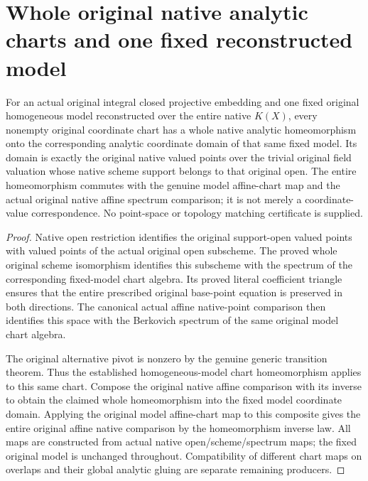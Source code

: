 \section{Whole original native analytic charts and one fixed reconstructed model}
\label{sec:projective-fixed-native-analytic-charts}

\begin{theorem}
\label{thm:projective-fixed-native-analytic-charts}
\leanok
{}
For an actual original integral closed projective embedding and one
fixed original homogeneous model reconstructed over the entire native
$K(X)$, every nonempty original coordinate chart has a whole native
analytic homeomorphism onto the corresponding analytic coordinate
domain of that same fixed model. Its domain is exactly the original
native valued points over the trivial original field valuation whose
native scheme support belongs to that original open. The entire
homeomorphism commutes with the genuine model affine-chart map and the
actual original native affine spectrum comparison; it is not merely a
coordinate-value correspondence. No point-space or topology matching
certificate is supplied.
\end{theorem}
\begin{proof}
Native open restriction identifies the original support-open valued
points with valued points of the actual original open subscheme.
The proved whole original scheme isomorphism identifies this subscheme
with the spectrum of the corresponding fixed-model chart algebra.
Its proved literal coefficient triangle ensures that the entire
prescribed original base-point equation is preserved in both directions.
The canonical actual affine native-point comparison then identifies
this space with the Berkovich spectrum of the same original model
chart algebra.

The original alternative pivot is nonzero by the genuine generic
transition theorem. Thus the established homogeneous-model chart
homeomorphism applies to this same chart. Compose the original native
affine comparison with its inverse to obtain the claimed whole
homeomorphism into the fixed model coordinate domain. Applying the
original model affine-chart map to this composite gives the entire
original affine native comparison by the homeomorphism inverse law.
All maps are constructed from actual native open/scheme/spectrum maps;
the fixed original model is unchanged throughout. Compatibility of
different chart maps on overlaps and their global analytic gluing are
separate remaining producers.
\end{proof}

